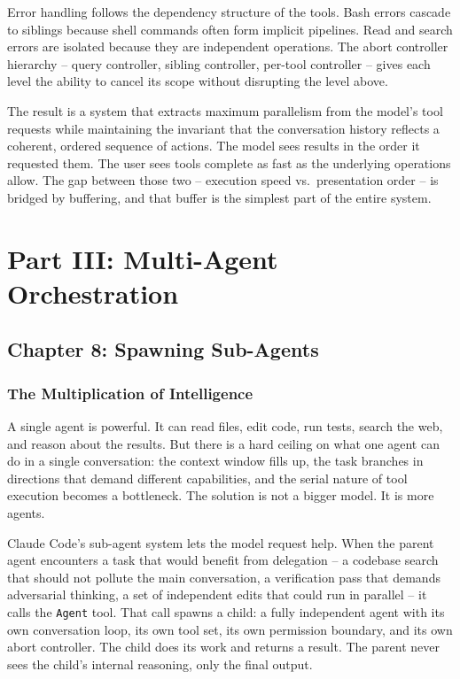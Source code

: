 \documentclass[
  english,
  11pt,
  letterpaper,
]{book}
\begin{document}
Error handling follows the dependency structure of the tools. Bash
errors cascade to siblings because shell commands often form implicit
pipelines. Read and search errors are isolated because they are
independent operations. The abort controller hierarchy -- query
controller, sibling controller, per-tool controller -- gives each level
the ability to cancel its scope without disrupting the level above.

The result is a system that extracts maximum parallelism from the
model's tool requests while maintaining the invariant that the
conversation history reflects a coherent, ordered sequence of actions.
The model sees results in the order it requested them. The user sees
tools complete as fast as the underlying operations allow. The gap
between those two -- execution speed vs.~presentation order -- is
bridged by buffering, and that buffer is the simplest part of the entire
system.

\part{Part III: Multi-Agent Orchestration}

\chapter{Chapter 8: Spawning
Sub-Agents}\label{chapter-8-spawning-sub-agents}

\section{The Multiplication of
Intelligence}\label{the-multiplication-of-intelligence}

A single agent is powerful. It can read files, edit code, run tests,
search the web, and reason about the results. But there is a hard
ceiling on what one agent can do in a single conversation: the context
window fills up, the task branches in directions that demand different
capabilities, and the serial nature of tool execution becomes a
bottleneck. The solution is not a bigger model. It is more agents.

Claude Code's sub-agent system lets the model request help. When the
parent agent encounters a task that would benefit from delegation -- a
codebase search that should not pollute the main conversation, a
verification pass that demands adversarial thinking, a set of
independent edits that could run in parallel -- it calls the
\texttt{Agent} tool. That call spawns a child: a fully independent agent
with its own conversation loop, its own tool set, its own permission
boundary, and its own abort controller. The child does its work and
returns a result. The parent never sees the child's internal reasoning,
only the final output.
\end{document}
